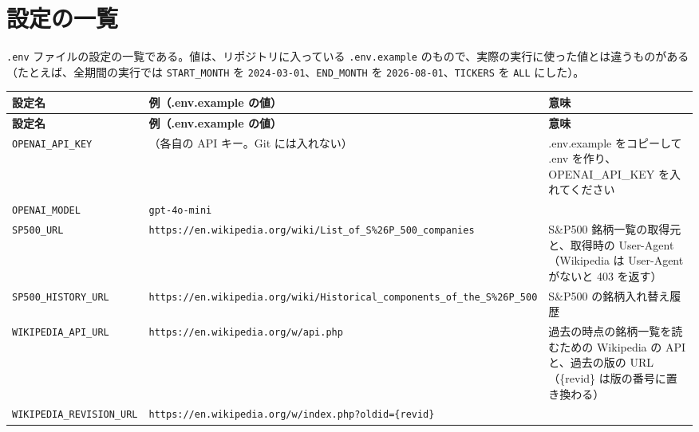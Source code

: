 \documentclass[xelatex,ja=standard,jafont=hiragino-pron,a4paper,10pt]{bxjsreport}
\newcommand{\code}[1]{\texttt{#1}}
\begin{document}
\chapter{設定の一覧}\label{app:env}

\code{.env} ファイルの設定の一覧である。値は、リポジトリに入っている \code{.env.example} のもので、実際の実行に使った値とは違うものがある（たとえば、全期間の実行では \code{START\_MONTH} を \code{2024-03-01}、\code{END\_MONTH} を \code{2026-08-01}、\code{TICKERS} を \code{ALL} にした）。

{\footnotesize
\begin{longtable}{p{4.60cm}p{3.60cm}p{6.20cm}}
\toprule
\textbf{設定名} & \textbf{例（.env.example の値）} & \textbf{意味} \\
\midrule
\endfirsthead
\toprule
\textbf{設定名} & \textbf{例（.env.example の値）} & \textbf{意味} \\
\midrule
\endhead
\bottomrule
\endfoot
\texttt{OPENAI\_\allowbreak{}API\_\allowbreak{}KEY} & （各自の API キー。Git には入れない） & .env.example をコピーして .env を作り、OPENAI\_API\_KEY を入れてください \\
\texttt{OPENAI\_\allowbreak{}MODEL} & \texttt{gpt-4o-mini} &  \\
\texttt{SP500\_\allowbreak{}URL} & \texttt{https://\allowbreak{}en.\allowbreak{}wikipedia.\allowbreak{}org/\allowbreak{}wiki/\allowbreak{}List\_\allowbreak{}of\_\allowbreak{}S\%26P\_\allowbreak{}500\_\allowbreak{}companies} & S\&P500 銘柄一覧の取得元と、取得時の User-Agent（Wikipedia は User-Agent がないと 403 を返す） \\
\texttt{SP500\_\allowbreak{}HISTORY\_\allowbreak{}URL} & \texttt{https://\allowbreak{}en.\allowbreak{}wikipedia.\allowbreak{}org/\allowbreak{}wiki/\allowbreak{}Historical\_\allowbreak{}components\_\allowbreak{}of\_\allowbreak{}the\_\allowbreak{}S\%26P\_\allowbreak{}500} & S\&P500 の銘柄入れ替え履歴 \\
\texttt{WIKIPEDIA\_\allowbreak{}API\_\allowbreak{}URL} & \texttt{https://\allowbreak{}en.\allowbreak{}wikipedia.\allowbreak{}org/\allowbreak{}w/\allowbreak{}api.\allowbreak{}php} & 過去の時点の銘柄一覧を読むための Wikipedia の API と、過去の版の URL（\{revid\} は版の番号に置き換わる） \\
\texttt{WIKIPEDIA\_\allowbreak{}REVISION\_\allowbreak{}URL} & \texttt{https://\allowbreak{}en.\allowbreak{}wikipedia.\allowbreak{}org/\allowbreak{}w/\allowbreak{}index.\allowbreak{}php?\allowbreak{}oldid=\allowbreak{}\{revid\}} &  \\

\end{longtable}}
\end{document}

